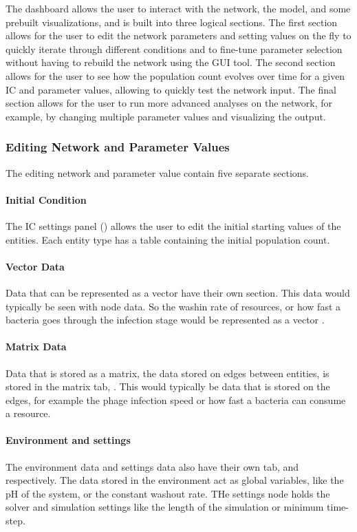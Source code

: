The dashboard allows the user to interact with the network, the model, and some prebuilt visualizations, and is built into three logical sections.
The first section allows for the user to edit the network parameters and setting values on the fly to quickly iterate through different conditions and to fine-tune parameter selection without having to rebuild the network using the GUI tool.
The second section allows for the user to see how the population count evolves over time for a given IC and parameter values, allowing to quickly test the network input.
The final section allows for the user to run more advanced analyses on the network, for example, by changing multiple parameter values and visualizing the output. 

\subsubsection{Editing Network and Parameter Values}
\label{sec:editing_network_and_parameter_values}
The editing network and parameter value contain five separate sections.
\paragraph{Initial Condition}
The IC settings panel () allows the user to edit the initial starting values of the entities. 
Each entity type has a table containing the initial population count. 
\paragraph{Vector Data} 
Data that can be represented as a vector have their own section. 
This data would typically be seen with node data. 
So the washin rate of resources, or how fast a bacteria goes through the infection stage would be represented as a vector .
\paragraph{Matrix Data}
Data that is stored as a matrix, the data stored on edges between entities, is stored in the matrix tab, .
This would typically be data that is stored on the edges, for example the phage infection speed or how fast a bacteria can consume a resource. 
\paragraph{Environment and settings}
The environment data and settings data also have their own tab,  and  respectively. 
The data stored in the environment act as global variables, like the pH of the system, or the constant washout rate. 
THe settings node holds the solver and simulation settings like the length of the simulation or minimum time-step. 

